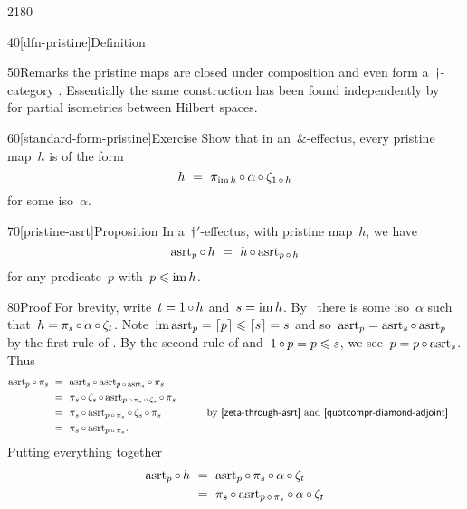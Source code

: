 \begin{parsec}{2180}
\begin{point}{40}[dfn-pristine]{Definition}
\begin{point}{50}{Remarks}
    the pristine maps are closed under composition and even
    form a~$\dagger$-category \cite{effintro}.
Essentially the same construction
    has been found independently by~\cite{hines2010structure}
    for partial isometries between Hilbert spaces.
\end{point}
\end{point}
\begin{point}{60}[standard-form-pristine]{Exercise}%
Show that in an~$\&$-effectus, every pristine map~$h$ is of the form
        \begin{equation*}
            h \ =\ \pi_{\operatorname{im} h} \mathop{\circ} \alpha \mathop{\circ} \zeta_{1 \mathop{\circ} h}
        \end{equation*}
        for some iso~$\alpha$.
\end{point}
\begin{point}{70}[pristine-asrt]{Proposition}%
In a~$\dagger'$-effectus,
    with pristine map~$h$, we have
\begin{equation*}
    \mathrm{asrt}_p \mathop{\circ} h
        \ =\  h \mathop{\circ} \mathrm{asrt}_{p \mathop{\circ} h}
\end{equation*}
for any predicate~$p$ with~$p \leqslant \operatorname{im} h$.
\begin{point}{80}{Proof}%
For brevity,
write~$t = 1 \mathop{\circ} h$
    and~$s = \operatorname{im} h$.
By~
    there is some iso~$\alpha$
    such that~$h = \pi_s \mathop{\circ} \alpha \mathop{\circ} \zeta_t$.
    Note~$\operatorname{im} \mathrm{asrt}_p = \left\lceil p \right\rceil \leqslant \left\lceil s\right\rceil = s$
    and so~$\mathrm{asrt}_p = \mathrm{asrt}_{s} \mathop{\circ} \mathrm{asrt}_p$
    by the first rule of .
By the second rule of 
    and~$1 \mathop{\circ} p = p \leqslant s$,
    we see~$p = p \mathop{\circ} \mathrm{asrt}_{s}$.
Thus
\begin{alignat*}{2}
    \asrt_p \after \pi_{s}
    &\ =\  \asrt_{s} \after \asrt_{p \after \asrt_{s}} \after \pi_{s} \\
    &\ =\  \pi_{s} \after \zeta_{s} \after
    \asrt_{p \after \pi_{s} \after \zeta_{s}} \after \pi_{s} \\
    &\ =\  \pi_{s}  \after
    \asrt_{p \after \pi_{s}} \after \zeta_{s} \after \pi_{s} 
    &\qquad& \text{by \sref{zeta-through-asrt}
                    and \sref{quotcompr-diamond-adjoint} }\\
    &\ =\  \pi_{s}  \after
    \asrt_{p \after \pi_{s}}.
\end{alignat*}
Putting everything together
\begin{alignat*}{2}
   \asrt_p \after h
   & \ =\  \asrt_p \after \pi_s \after \alpha \after \zeta_t \\
   & \ =\  \pi_s \after \asrt_{p\after\pi_s} \after \alpha \after \zeta_t  \\

\end{alignat*}
\end{point}
\end{point}
\end{parsec}

